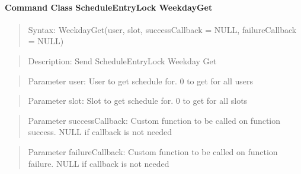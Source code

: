 \paragraph {Command Class ScheduleEntryLock WeekdayGet}
\begin{quote} Syntax: WeekdayGet(user, slot, successCallback = NULL, failureCallback = NULL)\end{quote}
\begin{quote} Description: Send ScheduleEntryLock Weekday Get\end{quote}
\begin{quote} Parameter user: User to get schedule for. 0 to get for all users\end{quote}
\begin{quote} Parameter slot: Slot to get schedule for. 0 to get for all slots\end{quote}
\begin{quote} Parameter successCallback: Custom function to be called on function success. NULL if callback is not needed\end{quote}
\begin{quote} Parameter failureCallback: Custom function to be called on function failure. NULL if callback is not needed\end{quote}

